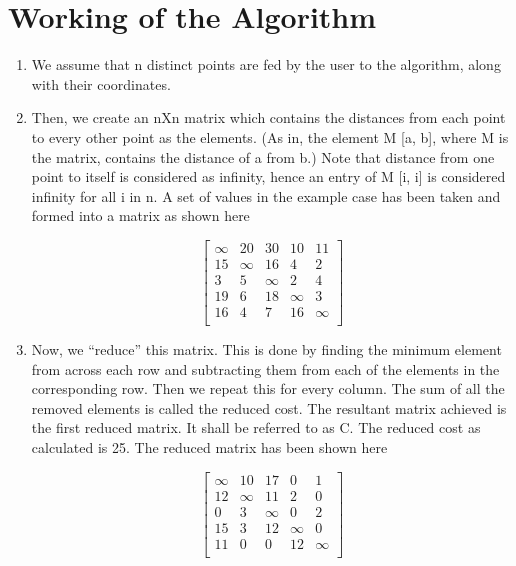 \documentclass{article}
\begin{document}
\section{Working of the Algorithm}
\begin{enumerate}

    \item We assume that n distinct points are fed by the user to the
algorithm, along with their coordinates.

    \item Then, we create an nXn matrix which contains the
distances from each point to every other point as the
elements. (As in, the element M [a, b], where M is the
matrix, contains the distance of a from b.) Note that
distance from one point to itself is considered as infinity,
hence an entry of M [i, i] is considered infinity for all i in
n. A set of values in the example case has been taken and
formed into a matrix as shown here

$$
\left[ {\begin{array}{ccccc}
     \infty & 20 & 30 & 10 & 11\\
     15 & \infty & 16 & 4 & 2\\
     3 & 5 & \infty & 2 & 4\\
     19 & 6 & 18 & \infty & 3\\
     16 & 4 & 7 & 16 & \infty\\
\end{array} }
\right]
$$

    \item Now, we “reduce” this matrix. This is done by finding the
minimum element from across each row and subtracting
them from each of the elements in the corresponding row.
Then we repeat this for every column. The sum of all the
removed elements is called the reduced cost. The
resultant matrix achieved is the first reduced matrix. It
shall be referred to as C. The reduced cost as calculated is 25. The reduced matrix has been
shown here

$$
\left[ {\begin{array}{ccccc}
     \infty & 10 & 17 & 0 & 1\\
     12 & \infty & 11 & 2 & 0\\
     0 & 3 & \infty & 0 & 2\\
     15 & 3 & 12 & \infty & 0\\
     11 & 0 & 0 & 12 & \infty\\
\end{array} }
\right]
$$


\end{enumerate}
\end{document}
